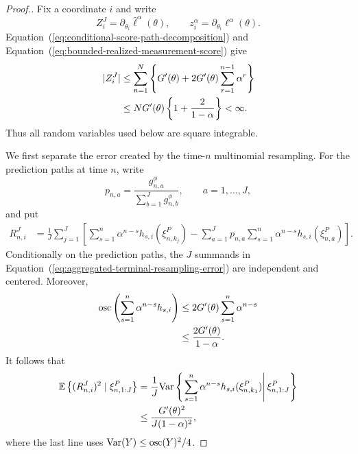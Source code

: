 \documentclass[11pt]{article}
\theoremstyle{thmstylethree}%
\begin{document}
\iffalse
\begin{proof}[Proof.]
Fix a coordinate $i$ and write
\begin{equation}
Z_i^J=\partial_{\theta_i}\hat\ell^\alpha(\theta),
\qquad
z_i^\alpha=\partial_{\theta_i}\ell^\alpha(\theta).
\label{eq:dmop-direct-error-coordinate-definitions}
\end{equation}
Equation~(\ref{eq:conditional-score-path-decomposition}) and
Equation~(\ref{eq:bounded-realized-measurement-score}) give
\begin{align}
|Z_i^J|
&\leq
\sum_{n=1}^N
\left\{
G'(\theta)+2G'(\theta)\sum_{r=1}^{n-1}\alpha^r
\right\}                                                   \notag\\
&\leq
NG'(\theta)\left\{1+\frac{2}{1-\alpha}\right\}<\infty.
\label{eq:dmop-direct-error-square-integrability}
\end{align}
Thus all random variables used below are square integrable.

We first separate the error created by the time-$n$ multinomial
resampling.  For the prediction paths at time $n$, write
\begin{equation}
p_{n,a}
=
\frac{g_{n,a}^{\phi}}{\sum_{b=1}^Jg_{n,b}^{\phi}},
\qquad a=1,\ldots,J,
\label{eq:dmop-direct-time-n-resampling-probability}
\end{equation}
and put
\begin{align}
R_{n,i}^J
&=
\frac1J\sum_{j=1}^J
\left[
\sum_{s=1}^n\alpha^{n-s}h_{s,i}(\xi_{n,k_j}^P)
-\sum_{a=1}^Jp_{n,a}
\sum_{s=1}^n\alpha^{n-s}h_{s,i}(\xi_{n,a}^P)
\right].
\label{eq:aggregated-terminal-resampling-error}
\end{align}
Conditionally on the prediction paths, the $J$ summands in
Equation~(\ref{eq:aggregated-terminal-resampling-error}) are independent
and centered.  Moreover,
\begin{align}
\operatorname{osc}\left(
\sum_{s=1}^n\alpha^{n-s}h_{s,i}
\right)
&\leq
2G'(\theta)\sum_{s=1}^n\alpha^{n-s}                         \notag\\
&\leq
\frac{2G'(\theta)}{1-\alpha}.
\label{eq:aggregated-terminal-function-oscillation}
\end{align}
It follows that
\begin{align}
\mathbb{E}\left\{(R_{n,i}^J)^2\mid\xi_{n,1:J}^P\right\}
&=
\frac1J
\mathrm{Var}\left\{
\left.
\sum_{s=1}^n\alpha^{n-s}h_{s,i}(\xi_{n,k_1}^P)
\right|\xi_{n,1:J}^P
\right\}                                                   \notag\\
&\leq
\frac{G'(\theta)^2}{J(1-\alpha)^2},
\label{eq:aggregated-terminal-resampling-second-moment}
\end{align}
where the last line uses
$\mathrm{Var}(Y)\leq\operatorname{osc}(Y)^2/4$.


\end{proof}
\end{document}
